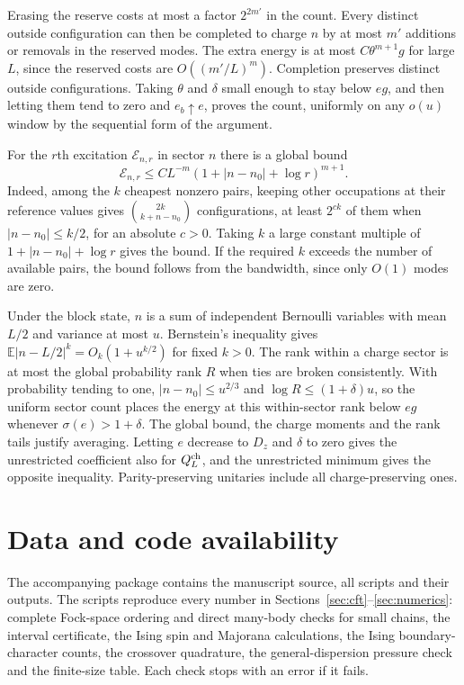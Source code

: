 \documentclass[11pt,a4paper]{article}
\theoremstyle{remark}
\newcommand{\E}{\mathbb E}
\begin{document}
Erasing the reserve costs at most a factor $2^{2m'}$ in the count. Every distinct outside configuration can then be completed to charge $n$ by at most $m'$ additions or removals in the reserved modes. The extra energy is at most $C\theta^{m+1}g$ for large $L$, since the reserved costs are $O((m'/L)^m)$. Completion preserves distinct outside configurations. Taking $\theta$ and $\delta$ small enough to stay below $eg$, and then letting them tend to zero and $e_b\uparrow e$, proves the count, uniformly on any $o(u)$ window by the sequential form of the argument.

For the $r$th excitation $\mathcal E_{n,r}$ in sector $n$ there is a global bound
\[
 \mathcal E_{n,r}\le C L^{-m}(1+|n-n_0|+\log r)^{m+1}.
\]
Indeed, among the $k$ cheapest nonzero pairs, keeping other occupations at their reference values gives $\binom{2k}{k+n-n_0}$ configurations, at least $2^{c k}$ of them when $|n-n_0|\le k/2$, for an absolute $c>0$. Taking $k$ a large constant multiple of $1+|n-n_0|+\log r$ gives the bound. If the required $k$ exceeds the number of available pairs, the bound follows from the bandwidth, since only $O(1)$ modes are zero.

Under the block state, $n$ is a sum of independent Bernoulli variables with mean $L/2$ and variance at most $u$. Bernstein's inequality gives $\E|n-L/2|^k=O_k(1+u^{k/2})$ for fixed $k>0$. The rank within a charge sector is at most the global probability rank $R$ when ties are broken consistently. With probability tending to one, $|n-n_0|\le u^{2/3}$ and $\log R\le(1+\delta)u$, so the uniform sector count places the energy at this within-sector rank below $eg$ whenever $\sigma(e)>1+\delta$. The global bound, the charge moments and the rank tails justify averaging. Letting $e$ decrease to $D_z$ and $\delta$ to zero gives the unrestricted coefficient also for $Q_L^{\rm ch}$, and the unrestricted minimum gives the opposite inequality. Parity-preserving unitaries include all charge-preserving ones.

\section*{Data and code availability}
The accompanying package contains the manuscript source, all scripts and their outputs. The scripts reproduce every number in Sections~\ref{sec:cft}--\ref{sec:numerics}: complete Fock-space ordering and direct many-body checks for small chains, the interval certificate, the Ising spin and Majorana calculations, the Ising boundary-character counts, the crossover quadrature, the general-dispersion pressure check and the finite-size table. Each check stops with an error if it fails.
\end{document}
